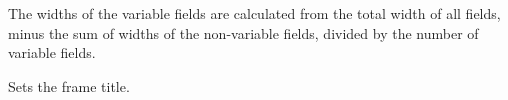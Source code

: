 
The widths of the variable fields are calculated from the total width of all fields,
minus the sum of widths of the non-variable fields, divided by the number of 
variable fields.

\label{wxframesettitle}


Sets the frame title.





